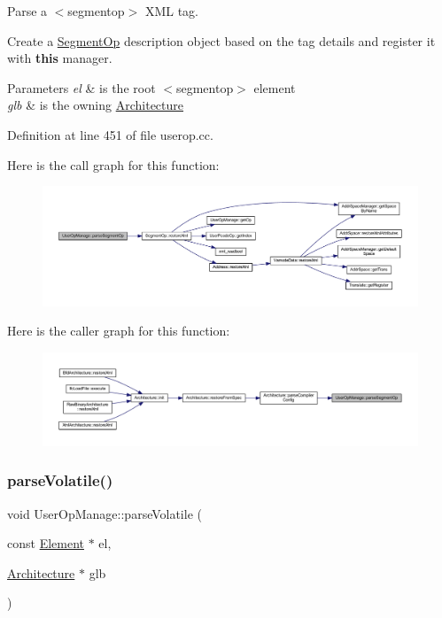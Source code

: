 Parse a $<$segmentop$>$ X\+ML tag. 

Create a \mbox{\hyperlink{class_segment_op}{Segment\+Op}} description object based on the tag details and register it with {\bfseries{this}} manager. 
\begin{DoxyParams}{Parameters}
{\em el} & is the root $<$segmentop$>$ element \\
\hline
{\em glb} & is the owning \mbox{\hyperlink{class_architecture}{Architecture}} \\
\hline
\end{DoxyParams}


Definition at line 451 of file userop.\+cc.

Here is the call graph for this function\+:
\nopagebreak
\begin{figure}[H]
\begin{center}
\leavevmode
\includegraphics[width=350pt]{class_user_op_manage_ab6ce4b3d4fb3046930b47b1e94c2131d_cgraph}
\end{center}
\end{figure}
Here is the caller graph for this function\+:
\nopagebreak
\begin{figure}[H]
\begin{center}
\leavevmode
\includegraphics[width=350pt]{class_user_op_manage_ab6ce4b3d4fb3046930b47b1e94c2131d_icgraph}
\end{center}
\end{figure}
\mbox{\label{class_user_op_manage_a643a087e70166f5e914673476c9189ba}} 
\subsubsection{\texorpdfstring{parseVolatile()}{parseVolatile()}}
{\footnotesize\ttfamily void User\+Op\+Manage\+::parse\+Volatile (\begin{DoxyParamCaption}\item[{const \mbox{\hyperlink{class_element}{Element}} $\ast$}]{el,  }\item[{\mbox{\hyperlink{class_architecture}{Architecture}} $\ast$}]{glb }\end{DoxyParamCaption})}



